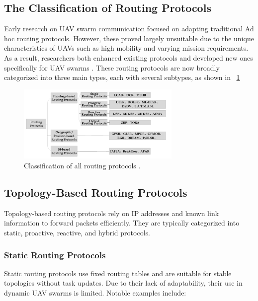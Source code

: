 
\subsection{The Classification of Routing Protocols}

Early research on UAV swarm communication focused on adapting traditional Ad hoc routing protocols. However, these proved largely unsuitable due to the unique characteristics of UAVs such as high mobility and varying mission requirements. As a result, researchers both enhanced existing protocols and developed new ones specifically for UAV swarms \cite{koubaa2017mavlink, Chen2020}. These routing protocols are now broadly categorized into three main types, each with several subtypes, as shown in ~\ref{fig:routing-protocols-classification}

\begin{figure}[ht]
\centering
\includegraphics[width=0.7\textwidth]{Figures/Chapter1/Section6/2.png}
\caption{Classification of all routing protocols \cite{Chen2020}.}
\label{fig:routing-protocols-classification}
\end{figure}



\subsection{Topology-Based Routing Protocols}

Topology-based routing protocols rely on IP addresses and known link information to forward packets efficiently. They are typically categorized into static, proactive, reactive, and hybrid protocols.

\subsubsection{Static Routing Protocols}


Static routing protocols use fixed routing tables and are suitable for stable topologies without task updates. Due to their lack of adaptability, their use in dynamic UAV swarms is limited. Notable examples include:

